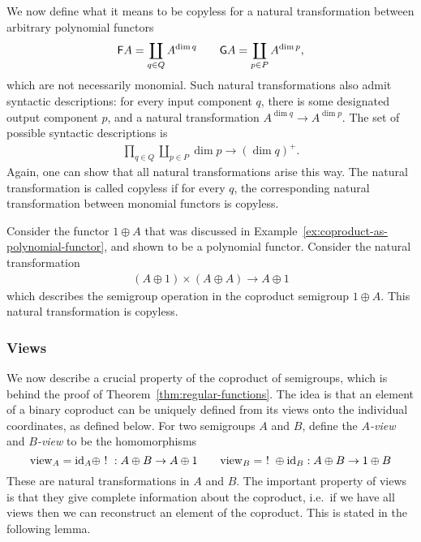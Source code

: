 We now define what it means to be copyless for a natural transformation between arbitrary polynomial functors 
\begin{align*}
\mathsf F A = \coprod_{q \in Q} A^{\dim q} \qquad 
\mathsf G A = \coprod_{p \in P} A^{\dim p},
\end{align*}
which are not necessarily monomial. Such natural transformations also admit syntactic descriptions: for every input component $q$, there is some designated output component $p$, and a natural transformation $A^{\dim q} \to A^{\dim p}$.  The set of possible syntactic descriptions is
\begin{align*}
\prod_{q \in Q} \coprod_{p \in P} \dim p \to (\dim q)^+.
\end{align*}
Again, one can show that all natural transformations arise this way. The natural transformation is called copyless if for every $q$, the corresponding natural transformation between monomial functors is copyless. 


\begin{myexample}\label{ex:copyless-on-coproducts}
    Consider the functor $1 \oplus A$ that was discussed in Example~\ref{ex:coproduct-as-polynomial-functor}, and shown to be a polynomial functor. Consider the natural transformation 
    \begin{align*}
    (A \oplus 1)\times (A \oplus A) \to A \oplus 1
    \end{align*}
    which describes the semigroup operation in the coproduct semigroup $1 \oplus A$. This natural transformation is copyless.
\end{myexample}


\subsubsection{Views}
\label{sec:views}

\newcommand{\combine}{\mathrm{combine}}
\newcommand{\view}{\mathrm{view}}

We now describe a crucial property of the coproduct of semigroups, which is behind the proof of Theorem~\ref{thm:regular-functions}. The idea is that an element of a binary coproduct can be uniquely defined from its views onto the individual coordinates, as defined below. 
For two semigroups $A$ and $B$, define the \emph{$A$-view} and \emph{$B$-view} to be the homomorphisms
\[
    \view_A = \id_A \oplus ~!~ : A \oplus B \to A \oplus 1 \qquad 
    \view_B = ~!~ \oplus \id_B : A \oplus B \to 1 \oplus B
\]
These are natural transformations in $A$ and $B$. The important property of views is that they give complete information about the coproduct, i.e.~if we have all views then we can reconstruct an element of the coproduct.
This is stated in the following lemma. 

